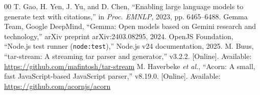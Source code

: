 \documentclass[conference]{IEEEtran}
\begin{document}
\begin{thebibliography}{00}
 T. Gao, H. Yen, J. Yu, and D. Chen, ``Enabling large language models to generate text with citations,'' in \emph{Proc. EMNLP}, 2023, pp. 6465--6488.
 Gemma Team, Google DeepMind, ``Gemma: Open models based on Gemini research and technology,'' arXiv preprint arXiv:2403.08295, 2024.
 OpenJS Foundation, ``Node.js test runner (\texttt{node:test}),'' Node.js v24 documentation, 2025.
 M. Buus, ``tar-stream: A streaming tar parser and generator,'' v3.2.2. [Online]. Available: \url{https://github.com/mafintosh/tar-stream}
 M. Haverbeke \emph{et al.}, ``Acorn: A small, fast JavaScript-based JavaScript parser,'' v8.19.0. [Online]. Available: \url{https://github.com/acornjs/acorn}
\end{thebibliography}
\end{document}
